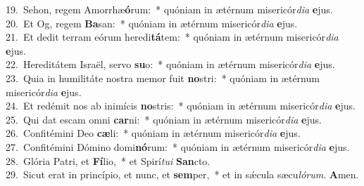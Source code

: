 {19.~}Sehon, regem Amorrhæ\textbf{ó}rum:~* quóniam in ætérnum misericór\textit{di}\textit{a} \textbf{e}jus.\\
{20.~}Et Og, regem \textbf{Ba}san:~* quóniam in ætérnum misericór\textit{di}\textit{a} \textbf{e}jus.\\
{21.~}Et dedit terram eórum heredi\textbf{tá}tem:~* quóniam in ætérnum misericór\textit{di}\textit{a} \textbf{e}jus.\\
{22.~}Hereditátem Israël, servo \textbf{su}o:~* quóniam in ætérnum misericór\textit{di}\textit{a} \textbf{e}jus.\\
{23.~}Quia in humilitáte nostra memor fuit \textbf{no}stri:~* quóniam in ætérnum misericór\textit{di}\textit{a} \textbf{e}jus.\\
{24.~}Et redémit nos ab inimícis \textbf{no}stris:~* quóniam in ætérnum misericór\textit{di}\textit{a} \textbf{e}jus.\\
{25.~}Qui dat escam omni \textbf{car}ni:~* quóniam in ætérnum misericór\textit{di}\textit{a} \textbf{e}jus.\\
{26.~}Confitémini Deo \textbf{cæ}li:~* quóniam in ætérnum misericór\textit{di}\textit{a} \textbf{e}jus.\\
{27.~}Confitémini Dómino domi\textbf{nó}rum:~* quóniam in ætérnum misericór\textit{di}\textit{a} \textbf{e}jus.\\
{28.~}Glória Patri, et \textbf{Fí}lio,~* et Spirí\textit{tu}\textit{i} \textbf{San}cto.\\
{29.~}Sicut erat in princípio, et nunc, et \textbf{sem}per,~* et in sǽcula sæcu\textit{ló}\textit{rum}. \textbf{A}men.\\
